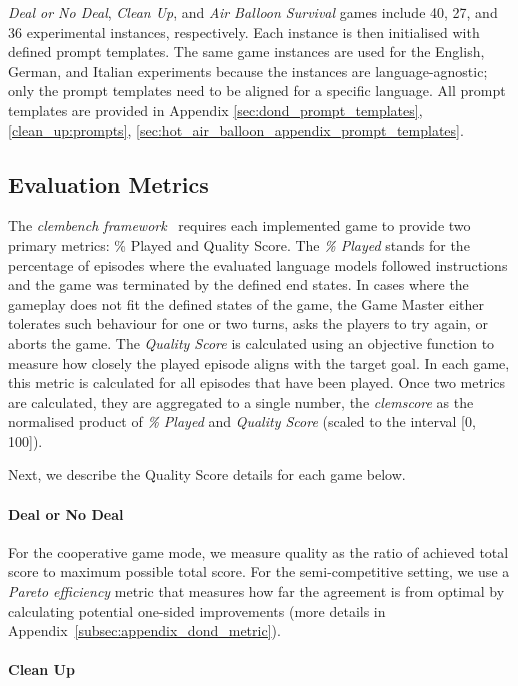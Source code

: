 \documentclass[11pt]{article}
\begin{document}
\textit{Deal or No Deal}, \textit{Clean Up}, and \textit{Air Balloon Survival} games include 40, 27, and 36 experimental instances, respectively. Each instance is then initialised with defined prompt templates. The same game instances are used for the English, German, and Italian experiments because the instances are language-agnostic; only the prompt templates need to be aligned for a specific language. All prompt templates are provided in Appendix \ref{sec:dond_prompt_templates}, \ref{clean_up:prompts}, \ref{sec:hot_air_balloon_appendix_prompt_templates}.


\subsection{Evaluation Metrics}

The \textit{clembench framework}~\cite{chalamalasetti-etal-2023-clembench} requires each implemented game to provide two primary metrics: \% Played and Quality Score. The \textit{\% Played} stands for the percentage of episodes where the evaluated language models followed instructions and the game was terminated by the defined end states. In cases where the gameplay does not fit the defined states of the game, the Game Master either tolerates such behaviour for one or two turns, asks the players to try again, or aborts the game. The \textit{Quality Score} is calculated using an objective function to measure how closely the played episode aligns with the target goal. In each game, this metric is calculated for all episodes that have been played. Once two metrics are calculated, they are aggregated to a single number, the \textit{clemscore} as the normalised product of \textit{\% Played} and \textit{Quality Score} (scaled to the interval [0, 100]).

Next, we describe the Quality Score details for each game below.

\paragraph{Deal or No Deal}

For the cooperative game mode, we measure quality as the ratio of achieved total score to maximum possible total score. For the semi-competitive setting, we use a \textit{Pareto efficiency} metric that measures how far the agreement is from optimal by calculating potential one-sided improvements (more details in Appendix~\ref{subsec:appendix_dond_metric}).

\paragraph{Clean Up}
\end{document}
